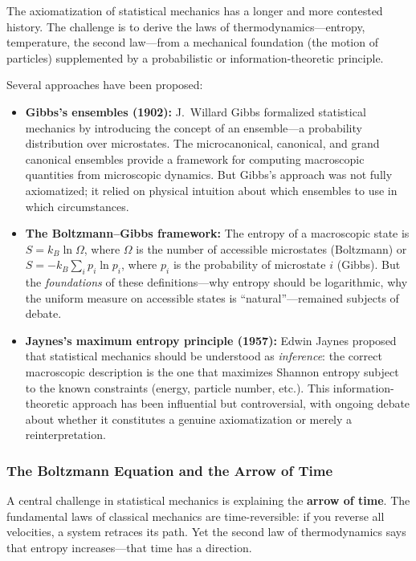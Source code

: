 The axiomatization of statistical mechanics has a longer and more contested history. The challenge is to derive the laws of thermodynamics---entropy, temperature, the second law---from a mechanical foundation (the motion of particles) supplemented by a probabilistic or information-theoretic principle.

Several approaches have been proposed:

\begin{itemize}
    \item \textbf{Gibbs's ensembles (1902):} J.\ Willard Gibbs formalized statistical mechanics by introducing the concept of an ensemble---a probability distribution over microstates. The microcanonical, canonical, and grand canonical ensembles provide a framework for computing macroscopic quantities from microscopic dynamics. But Gibbs's approach was not fully axiomatized; it relied on physical intuition about which ensembles to use in which circumstances.

    \item \textbf{The Boltzmann--Gibbs framework:} The entropy of a macroscopic state is $S = k_B \ln \Omega$, where $\Omega$ is the number of accessible microstates (Boltzmann) or $S = -k_B \sum_i p_i \ln p_i$, where $p_i$ is the probability of microstate $i$ (Gibbs). But the \emph{foundations} of these definitions---why entropy should be logarithmic, why the uniform measure on accessible states is ``natural''---remained subjects of debate.

    \item \textbf{Jaynes's maximum entropy principle (1957):} Edwin Jaynes proposed that statistical mechanics should be understood as \emph{inference}: the correct macroscopic description is the one that maximizes Shannon entropy subject to the known constraints (energy, particle number, etc.). This information-theoretic approach has been influential but controversial, with ongoing debate about whether it constitutes a genuine axiomatization or merely a reinterpretation.
\end{itemize}

\subsubsection{The Boltzmann Equation and the Arrow of Time}

A central challenge in statistical mechanics is explaining the \textbf{arrow of time}. The fundamental laws of classical mechanics are time-reversible: if you reverse all velocities, a system retraces its path. Yet the second law of thermodynamics says that entropy increases---that time has a direction.

